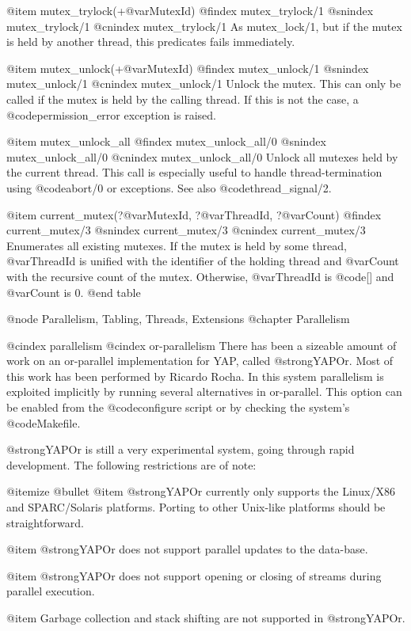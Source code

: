 {{{{{{{{@item mutex_trylock(+@var{MutexId})
@findex mutex_trylock/1
@snindex mutex_trylock/1
@cnindex mutex_trylock/1
As mutex_lock/1, but if the mutex is held by another thread, this
predicates fails immediately.

@item mutex_unlock(+@var{MutexId})
@findex mutex_unlock/1
@snindex mutex_unlock/1
@cnindex mutex_unlock/1
Unlock the mutex. This can only be called if the mutex is held by the
calling thread. If this is not the case, a @code{permission_error}
exception is raised.

@item mutex_unlock_all
@findex mutex_unlock_all/0
@snindex mutex_unlock_all/0
@cnindex mutex_unlock_all/0
Unlock all mutexes held by the current thread.  This call is especially
useful to handle thread-termination using @code{abort/0} or exceptions.  See
also @code{thread_signal/2}.

@item current_mutex(?@var{MutexId}, ?@var{ThreadId}, ?@var{Count})
@findex current_mutex/3
@snindex current_mutex/3
@cnindex current_mutex/3
Enumerates all existing mutexes.  If the mutex is held by some thread,
@var{ThreadId} is unified with the identifier of the holding thread and
@var{Count} with the recursive count of the mutex. Otherwise,
@var{ThreadId} is @code{[]} and @var{Count} is 0.
@end table


@node Parallelism, Tabling, Threads, Extensions
@chapter Parallelism

@cindex parallelism
@cindex or-parallelism
There has been a sizeable amount of work on an or-parallel
implementation for YAP, called @strong{YAPOr}. Most of this work has
been performed by Ricardo Rocha. In this system parallelism is exploited
implicitly by running several alternatives in or-parallel. This option
can be enabled from the @code{configure} script or by checking the
system's @code{Makefile}.

@strong{YAPOr} is still a very experimental system, going through rapid
development. The following restrictions are of note:

@itemize @bullet
@item @strong{YAPOr} currently only supports the Linux/X86 and SPARC/Solaris
platforms. Porting to other Unix-like platforms should be straightforward.

@item @strong{YAPOr} does not support parallel updates to the
data-base.

@item @strong{YAPOr} does not support opening or closing of streams during
parallel execution.

@item Garbage collection and stack shifting are not supported in
@strong{YAPOr}.  

}}}}}}}}
